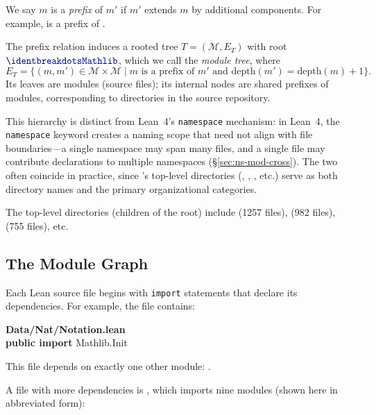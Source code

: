 We say $m$ is a \emph{prefix} of $m'$ if $m'$ extends $m$ by additional components. For example,  is a prefix of .

\begin{definition}\label{def:module-tree}
The prefix relation induces a rooted tree $T = (\mathcal{M}, E_T)$ with root $\module{Mathlib}$, which we call the \emph{module tree}, where
\[
  E_T = \{(m, m') \in \mathcal{M} \times \mathcal{M} \mid m \text{ is a prefix of } m' \text{ and } \mathrm{depth}(m') = \mathrm{depth}(m) + 1\}.
\]
Its leaves are modules (source files); its internal nodes are shared prefixes of modules, corresponding to directories in the source repository.
\end{definition} This hierarchy is distinct from Lean~4's \texttt{namespace} mechanism: in Lean~4, the \texttt{namespace} keyword creates a naming scope that need not align with file boundaries---a single namespace may span many files, and a single file may contribute declarations to multiple namespaces (\S\ref{sec:ns-mod-cross}). The two often coincide in practice, since 's top-level directories (, , , etc.) serve as both directory names and the primary organizational categories.

The top-level directories (children of the root) include  (1257 files),  (982 files),  (755 files), etc.

\subsection{The Module Graph}
\label{sec:import-graph}

Each Lean source file begins with \texttt{import} statements that declare its dependencies. For example, the file  contains:

\begin{codebox}
\textsf{\bfseries\color{blue!60!black}Data/Nat/Notation.lean}\\[2pt]
\textbf{public import} \textcolor{blue!60!black}{Mathlib.Init}
\end{codebox}

\noindent
This file depends on exactly one other module: .

A file with more dependencies is , which imports nine modules (shown here in abbreviated form):

